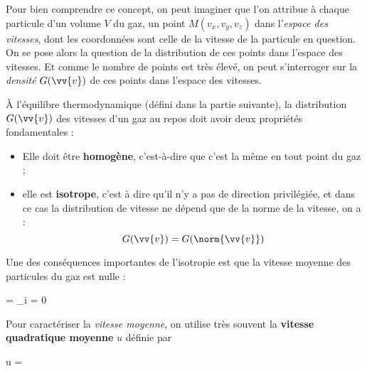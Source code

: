 \documentclass{cours}
\begin{document}
Pour bien comprendre ce concept, on peut imaginer que l'on attribue à chaque particule d'un volume $V$ du gaz, un point $M(v_x, v_y, v_z)$ dans l'\textit{espace des vitesses}, dont les coordonnées sont celle de la vitesse de la particule en question. On se pose alors la question de la distribution de ces points dans l'espace des vitesses. Et comme le nombre de points est très élevé, on peut s'interroger sur la \textit{densité} $G(\vv{v})$  de ces points dans l'espace des vitesses. 

\begin{center}
\end{center}

À l'équilibre thermodynamique (défini dans la partie suivante), la distribution $G(\vv{v})$ des vitesses d'un gaz au repos doit avoir deux propriétés fondamentales :
\begin{itemize}
  \item Elle doit être \textbf{homogène}, c'est-à-dire que c'est la même en tout point du gaz ;
  \item elle est \textbf{isotrope}, c'est à dire qu'il n'y a pas de direction privilégiée, et dans ce cas la distribution de vitesse ne dépend que de la norme de la vitesse, on a :
    \begin{equation}
      G(\vv{v}) = G(\norm{\vv{v}})
    \end{equation}
\end{itemize}

Une des conséquences importantes de l'isotropie est que la vitesse moyenne des particules du gaz est nulle :
\begin{eqencadre}
  \langle {} \rangle  =  \sum_i  = 0
\end{eqencadre}

Pour caractériser la \textit{vitesse moyenne}, on utilise très souvent la \textbf{vitesse quadratique moyenne} $u$ définie par
\begin{eqencadre}
  u =  
\end{eqencadre}
\end{document}
